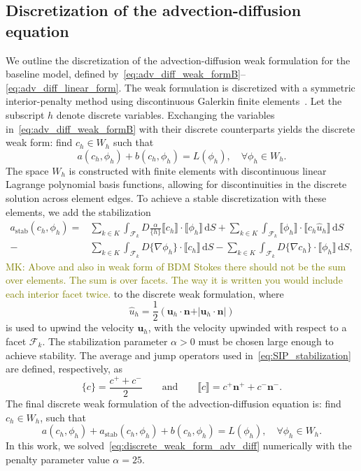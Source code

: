 \documentclass[fleqn]{wlscirep}
\newcommand{\intF}[1]{\int_{\mathcal{F}_k}#1 \, \mathrm dS}
\newcommand{\avg}[1]{\{#1\}}
\newcommand{\jump}[1]{\llbracket#1\rrbracket}
\newcommand{\nn}{\mathbf{n}}
\newcommand{\uu}{\mathbf{u}}
\newcommand{\mk}[1]{\textcolor{olive}{MK: #1}}
\begin{document}
\subsection{Discretization of the advection-diffusion equation}
We outline the discretization of the advection-diffusion weak formulation
for the baseline model, defined by~\eqref{eq:adv_diff_weak_formB}--\eqref{eq:adv_diff_linear_form}. The weak formulation is discretized with a symmetric interior-penalty method using discontinuous Galerkin finite elements~\cite{Arnold1982AnElements}. Let the subscript $h$ denote discrete variables. Exchanging the variables in~\eqref{eq:adv_diff_weak_formB} with their discrete counterparts yields the discrete weak form: find $c_h\in W_h$ such that
\begin{equation*}
    a(c_h, \phi_h) + b(c_h, \phi_h) = L(\phi_h), \quad\forall\phi_h\in W_h.
\end{equation*}
The space $W_h$ is constructed with  finite elements with discontinuous linear Lagrange polynomial basis functions, allowing for discontinuities in the discrete solution across element edges.  To achieve a stable discretization with these elements, we add the stabilization
\begin{equation}
    \begin{aligned}
        a_{\mathrm{stab}}(c_h, \phi_h) = &\sum_{k\in K}\intF{D\frac{\alpha}{\avg{h}}\jump{c_h}\cdot\jump{\phi_h}} +\sum_{k\in K}\intF{\jump{\phi_h}\cdot\jump{c_h \hat{u}_h}}  \\
         -&\sum_{k\in K}\intF{D\avg{\nabla\phi_h}\cdot\jump{c_h}} -\sum_{k\in K}\intF{D\avg{\nabla c_h}\cdot\jump{\phi_h}},
    \end{aligned}\label{eq:SIP_stabilization}
\end{equation}
\mk{
Above and also in weak form of BDM Stokes there should not be the sum over elements.
The sum is over facets. The way it is written you would include each interior facet twice.
}
to the discrete weak formulation, where
\begin{equation*}
    \hat{u}_h = \frac{1}{2}\left(\uu_h\cdot\nn + \vert\uu_h\cdot\nn\vert\right)
\end{equation*}
is used to upwind the velocity $\uu_h$, with the velocity upwinded with respect to a facet $\mathcal{F}_k$. The stabilization parameter $\alpha>0$ must be chosen large enough to achieve stability. The average and jump operators used in~\eqref{eq:SIP_stabilization} are defined, respectively, as
\begin{equation*}
    \avg{c} = \frac{c^+ + c^-}{2} \qquad\mathrm{and}\qquad \jump{c} = c^+\nn^+ + c^-\nn^-.
\end{equation*}
The final discrete weak formulation of the advection-diffusion equation is: find $c_h\in W_h$, such that
\begin{equation}
    a(c_h, \phi_h) + a_{\mathrm{stab}}(c_h, \phi_h) + b(c_h, \phi_h) = L(\phi_h), \quad\forall\phi_h\in W_h.
    \label{eq:discrete_weak_form_adv_diff}
\end{equation}
In this work, we solved~\eqref{eq:discrete_weak_form_adv_diff} numerically with the penalty parameter value $\alpha=25$.
\end{document}
